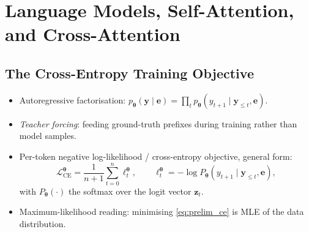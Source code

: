 \documentclass[titlepage,a4paper,11pt]{report}
\begin{document}
    \section{Language Models, Self-Attention, and Cross-Attention}
    
        \subsection{The Cross-Entropy Training Objective}\label{sec:prelim_ce}
        \begin{itemize}
            \item Autoregressive factorisation:
                  $p_{\bm\theta}(\bm y \mid \bm e) = \prod_{t} p_{\bm\theta}(y_{t+1} \mid \bm y_{\le t}, \bm e)$.
            \item \emph{Teacher forcing}: feeding ground-truth prefixes during training
                  rather than model samples. \cite{williams_learning_1989}
            \item Per-token negative log-likelihood / cross-entropy objective, general form:
            \begin{equation}\label{eq:prelim_ce}
                \mathcal{L}_{\text{CE}}^{\bm\theta} = \frac{1}{n+1}\sum_{t=0}^{n}\ell_t^{\bm\theta},
                \qquad
                \ell_t^{\bm\theta} = -\log P_{\bm\theta}(y_{t+1}\mid \bm y_{\le t},\bm e),
            \end{equation}
            with $P_{\bm\theta}(\cdot)$ the softmax over the logit vector $\bm z_t$.
            \item Maximum-likelihood reading: minimising \eqref{eq:prelim_ce} is MLE of the
                  data distribution. %
        \end{itemize}
    
\end{document}

